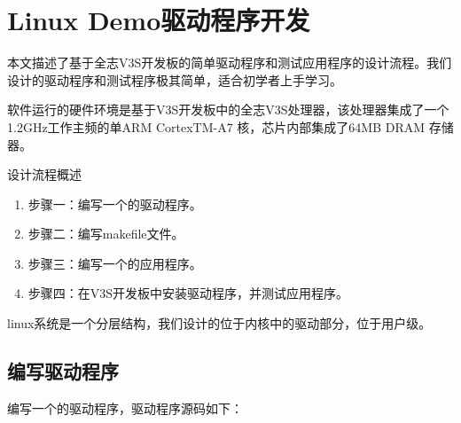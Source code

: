 \documentclass[lang=cn,newtx,10pt,scheme=chinese]{elegantbook}
\begin{document}
\chapter{Linux Demo驱动程序开发}

本文描述了基于全志V3S开发板的简单驱动程序和测试应用程序的设计流程。我们设计的驱动程序和测试程序极其简单，适合初学者上手学习。

软件运行的硬件环境是基于V3S开发板中的全志V3S处理器，该处理器集成了一个1.2GHz工作主频的单ARM CortexTM-A7 核，芯片内部集成了64MB DRAM 存储器。

设计流程概述

\begin{enumerate}
    \item 步骤一：编写一个的驱动程序。
    \item 步骤二：编写makefile文件。
    \item 步骤三：编写一个的应用程序。
    \item 步骤四：在V3S开发板中安装驱动程序，并测试应用程序。
\end{enumerate}

linux系统是一个分层结构，我们设计的位于内核中的驱动部分，位于用户级。

\section{编写驱动程序}

编写一个的驱动程序，驱动程序源码如下：
\end{document}
